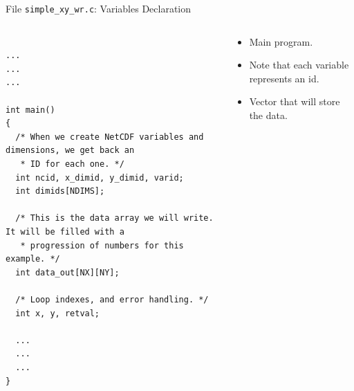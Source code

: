 \documentclass[compress,11pt,xcolor=svgnames,aspectratio=169]{beamer}
\begin{document}
\begin{frame}[fragile]{File \texttt{simple\_xy\_wr.c}: Variables Declaration}

\begin{columns}

\begin{column}{0.5\textwidth}

{\tiny

\begin{verbatim}

...
...
...

int main()
{
  /* When we create NetCDF variables and dimensions, we get back an
   * ID for each one. */
  int ncid, x_dimid, y_dimid, varid;
  int dimids[NDIMS];

  /* This is the data array we will write. It will be filled with a
   * progression of numbers for this example. */
  int data_out[NX][NY];

  /* Loop indexes, and error handling. */
  int x, y, retval;

  ...
  ...
  ...
}

\end{verbatim}

}

\end{column}

\begin{column}{0.5\textwidth}

\vspace*{-1cm}

{\footnotesize

\begin{itemize}
\setlength\itemsep{0.1cm}

\item Main program.

\item Note that each variable represents an id.


\item Vector that will store the data.

\end{itemize}

}

\end{column}

\end{columns}

\end{frame}
\end{document}
